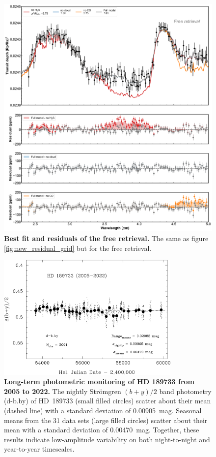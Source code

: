 \documentclass[sn-standardnature]{sn-jnl}%
\begin{document}
\begin{figure}
\centering
  \includegraphics[width=\textwidth,keepaspectratio]{figs/SI_Fig4.png}
  \caption{\textbf{Best fit and residuals of the free retrieval.} The same as figure \ref{fig:new_residual_grid} but for the free retrieval.}
  \label{fig:new_residual_free}
\end{figure}

\begin{figure}
\centering
  \includegraphics[width=0.8\textwidth,keepaspectratio]{figs/SI_Fig5.png}
  \caption{\textbf{Long-term photometric monitoring of HD 189733 from 2005 to 2022.} The nightly Str\"omgren $(b+y)/2$ band photometry (d-b.by) of HD~189733 (small filled circles) scatter about their mean (dashed line) with a standard deviation of 0.00905~mag.  Seasonal means from the 31 data sets (large filled circles) scatter about their mean with a standard deviation of 0.00470~mag.  Together, these results indicate low-amplitude variability on both night-to-night and year-to-year timescales.}
  \label{fig:fig1_APT}
\end{figure}
\end{document}

